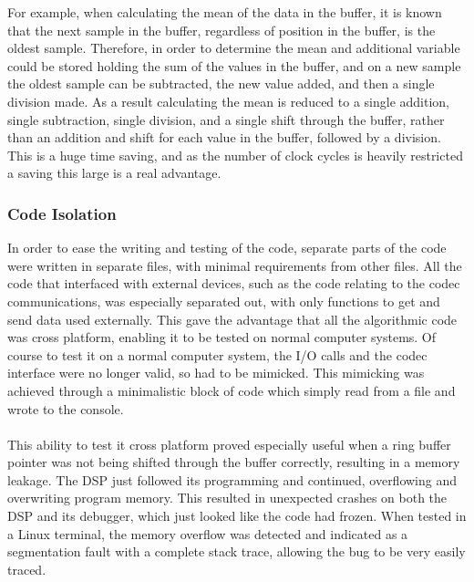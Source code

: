 For example, when calculating the mean of the data in the buffer, it is known that the next sample in the buffer, regardless of position in the buffer, is the oldest sample.
Therefore, in order to determine the mean and additional variable could be stored holding the sum of the values in the buffer, and on a new sample the oldest sample can be subtracted, the new value added, and then a single division made.
As a result calculating the mean is reduced to a single addition, single subtraction, single division, and a single shift through the buffer, rather than an addition and shift for each value in the buffer, followed by a division.
This is a huge time saving, and as the number of clock cycles is heavily restricted a saving this large is a real advantage.

\subsubsection{Code Isolation}
In order to ease the writing and testing of the code, separate parts of the code were written in separate files, with minimal requirements from other files.
All the code that interfaced with external devices, such as the code relating to the codec communications, was especially separated out, with only functions
to get and send data used externally.
This gave the advantage that all the algorithmic code was cross platform, enabling it to be tested on normal computer systems.
Of course to test it on a normal computer system, the I/O calls and the codec interface were no longer valid, so had to be mimicked.
This mimicking was achieved through a minimalistic block of code which simply read from a file and wrote to the console.
\\
\\
This ability to test it cross platform proved especially useful when a ring buffer pointer was not being shifted through the buffer correctly, resulting in a memory leakage.
The DSP just followed its programming and continued, overflowing and overwriting program memory.
This resulted in unexpected crashes on both the DSP and its debugger, which just looked like the code had frozen.
When tested in a Linux terminal, the memory overflow was detected and indicated as a segmentation fault with a complete stack trace, allowing the bug to be very easily traced.

